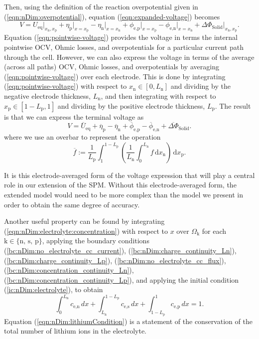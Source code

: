 \documentclass[a4paper]{article}
\newcommand{\add}{\color{black}}
\newcommand{\ts}[1]{_{\text{#1}}}
\newcommand{\kin}[1]{\text{k} \in \{\text{#1}\}}
\newcommand{\mybar}{\overline}
\begin{document}
Then, using the definition of the reaction overpotential given in (\ref{eqn:nDim:overpotential}), {\add equation} (\ref{eqn:expanded-voltage}) becomes
\begin{equation}\label{eqn:pointwise-voltage}
    V = U\ts{eq}\big|_{x\ts{n},x\ts{p}} 
        + \eta\ts{p}\big|_{x=x\ts{p}} - \eta\ts{n}\big|_{x=x\ts{n}} 
        + \phi\ts{e,p}\big|_{x=x\ts{p}} - \phi\ts{e,n}\big|_{x=x\ts{n}} 
        + \Delta \Phi\ts{Solid}\big|_{x\ts{n},x\ts{p}} .
\end{equation}
Equation (\ref{eqn:pointwise-voltage}) provides the voltage in terms the internal pointwise OCV, Ohmic losses, and overpotentials for a particular current path through the cell. However, we can also express the voltage in terms of the average (across all paths) OCV, Ohmic losses, and overpotentials by averaging (\ref{eqn:pointwise-voltage}) over each electrode. This is done by integrating (\ref{eqn:pointwise-voltage}) with respect to $x\ts{n}\in[0, L\ts{n}]$ and dividing by the negative electrode thickness, $L\ts{n}$, and then integrating with respect to $x\ts{p}\in[1-L\ts{p}, 1]$ and dividing by the positive electrode thickness, $L\ts{p}$. The result is that we can express the terminal voltage as
\begin{equation}\label{eqn:electrode-averaged-voltage}
  V = \mybar{U}\ts{eq}
        + \mybar{\eta}\ts{p} - \mybar{\eta}\ts{n}
        + \mybar{\phi}\ts{e,p} - \mybar{\phi}\ts{e,n}
        + \mybar{\Delta \Phi}\ts{Solid}.
\end{equation}
where we use an overbar to represent the operation
\begin{equation}
  \mybar{f} := \frac{1}{L\ts{p}}\int_{1}^{1-L\ts{p}} 
                  \left(\frac{1}{L\ts{n}}\int_0^{L\ts{n}} f \, \text{d}x\ts{n} \right) \, \text{d}x\ts{p}.
\end{equation}

It is this electrode-averaged form of the voltage expression that will play a central role in our extension of the SPM. Without this electrode-averaged form, the extended model would need to be more complex than the model we present in order to obtain the same degree of accuracy.

Another useful property can be found by integrating (\ref{eqn:nDim:electrolyte:concentration}) with respect to $x$ over $\Omega\ts{k}$ for each $\kin{n, s, p}$, applying the boundary conditions (\ref{bc:nDim:no_electrolyte_cc_current}), (\ref{bc:nDim:charge_continuity_Ln}), (\ref{bc:nDim:charge_continuity_Lp}), (\ref{bc:nDim:no_electrolyte_cc_flux}), (\ref{bc:nDim:concentration_continuity_Ln}), (\ref{bc:nDim:concentration_continuity_Lp}), and applying the initial condition (\ref{ic:nDim:electrolyte}),  to obtain
\begin{equation}\label{eqn:nDim:lithiumCondition} 
    \int_{0}^{L\ts{n}}c\ts{e,n}\,dx + \int_{L\ts{n}}^{1-L\ts{p}} c\ts{e,s} \, dx + \int_{1-L\ts{p}}^{1} c\ts{e,p}\,dx = 1.
\end{equation}
Equation (\ref{eqn:nDim:lithiumCondition}) is a statement of the conservation of the total number of lithium ions in the electrolyte.
\end{document}
